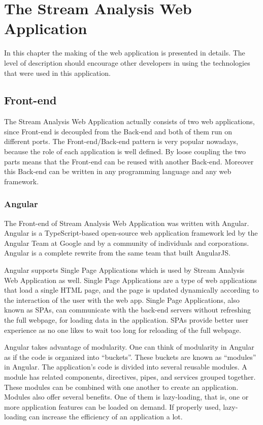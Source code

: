 \chapter{The Stream Analysis Web Application}
\label{chap:04}
In this chapter the making of the web application is presented in details. The level of description should encourage other developers in using the technologies that were used in this application.

\section{Front-end}
\label{chap:04:01}

The Stream Analysis Web Application actually consists of two web applications, since Front-end is decoupled from the Back-end and both of them run on different ports. The Front-end/Back-end pattern is very popular nowadays, because the role of each application is well defined. By loose coupling the two parts means that the Front-end can be reused with another Back-end. Moreover this Back-end can be written in any programming language and any web framework.

\subsection{Angular}
\label{chap:04:01:01}

The Front-end of Stream Analysis Web Application was written with Angular. Angular is a TypeScript-based open-source web application framework led by the Angular Team at Google and by a community of individuals and corporations. Angular is a complete rewrite from the same team that built AngularJS.\cite{angular-description}

Angular supports Single Page Applications which is used by Stream Analysis Web Application as well. Single Page Applications are a type of web applications that load a single HTML page, and the page is updated dynamically according to the interaction of the user with the web app. Single Page Applications, also known as SPAs, can communicate with the back-end servers without refreshing the full webpage, for loading data in the application. SPAs provide better user experience as no one likes to wait too long for reloading of the full webpage.\cite{why-learn-angular}

Angular takes advantage of modularity. One can think of modularity in Angular as if the code is organized into “buckets”. These buckets are known as “modules” in Angular. The application’s code is divided into several reusable modules. A module has related components, directives, pipes, and services grouped together. These modules can be combined with one another to create an application. Modules also offer several benefits. One of them is lazy-loading, that is, one or more application features can be loaded on demand. If properly used, lazy-loading can increase the efficiency of an application a lot.\cite{why-learn-angular}

